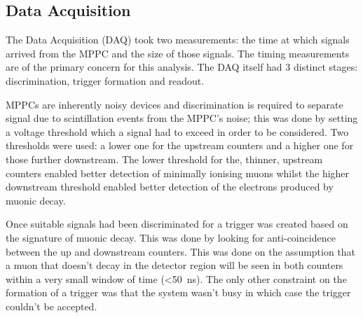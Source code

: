 \documentclass[]{article}
\begin{document}
\subsection{Data Acquisition} %
\label{sub:data_acquisition}
The Data Acquisition (DAQ) took two measurements: the time at which signals arrived from the MPPC and the size of those signals. The timing measurements are of the primary concern for this analysis. The DAQ itself had 3 distinct stages: discrimination, trigger formation and readout.

MPPCs are inherently noisy devices and discrimination is required to separate signal due to scintillation events from the MPPC's noise; this was done by setting a voltage threshold which a signal had to exceed in order to be considered. Two thresholds were used: a lower one for the upstream counters and a higher one for those further downstream. The lower threshold for the, thinner, upstream counters enabled better detection of minimally ionising muons whilst the higher downstream threshold enabled better detection of the electrons produced by muonic decay. 

Once suitable signals had been discriminated for a trigger was created based on the signature of muonic decay. This was done by looking for anti-coincidence between the up and downstream counters. This was done on the assumption that a muon that doesn't decay in the detector region will be seen in both counters within a very small window of time (<50~ns). The only other constraint on the formation of a trigger was that the system wasn't busy in which case the trigger couldn't be accepted.
\end{document}
